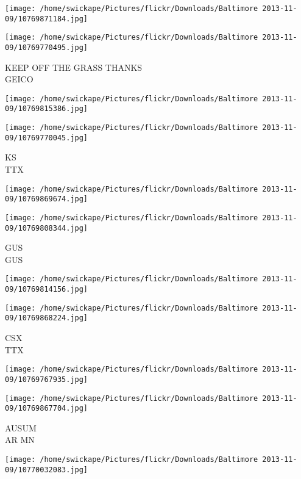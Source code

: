 \documentclass[10pt,letterpaper]{article}
\begin{document}
\texttt{[image: /home/swickape/Pictures/flickr/Downloads/Baltimore 2013-11-09/10769871184.jpg]}

\vspace{0.25in}
\texttt{[image: /home/swickape/Pictures/flickr/Downloads/Baltimore 2013-11-09/10769770495.jpg]}

KEEP OFF THE GRASS THANKS\\
GEICO\\
\pagebreak

\texttt{[image: /home/swickape/Pictures/flickr/Downloads/Baltimore 2013-11-09/10769815386.jpg]}

\vspace{0.25in}
\texttt{[image: /home/swickape/Pictures/flickr/Downloads/Baltimore 2013-11-09/10769770045.jpg]}

KS\\
TTX\\
\pagebreak

\texttt{[image: /home/swickape/Pictures/flickr/Downloads/Baltimore 2013-11-09/10769869674.jpg]}

\vspace{0.25in}
\texttt{[image: /home/swickape/Pictures/flickr/Downloads/Baltimore 2013-11-09/10769808344.jpg]}

GUS\\
GUS\\
\pagebreak

\texttt{[image: /home/swickape/Pictures/flickr/Downloads/Baltimore 2013-11-09/10769814156.jpg]}

\vspace{0.25in}
\texttt{[image: /home/swickape/Pictures/flickr/Downloads/Baltimore 2013-11-09/10769868224.jpg]}

CSX\\
TTX\\
\pagebreak

\texttt{[image: /home/swickape/Pictures/flickr/Downloads/Baltimore 2013-11-09/10769767935.jpg]}

\vspace{0.25in}
\texttt{[image: /home/swickape/Pictures/flickr/Downloads/Baltimore 2013-11-09/10769867704.jpg]}

AUSUM\\
AR MN\\
\pagebreak

\texttt{[image: /home/swickape/Pictures/flickr/Downloads/Baltimore 2013-11-09/10770032083.jpg]}
\end{document}
